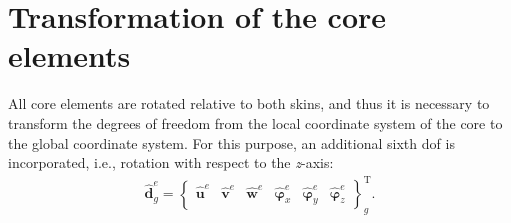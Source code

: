\section{Transformation of the core elements}
\label{sec:transformation}

All core elements are rotated relative to both skins, and thus it is necessary to transform the degrees of freedom from the local coordinate system of the core to the global coordinate system.
For this purpose, an additional sixth \ac{dof} is incorporated, i.e., rotation with respect to the \textit{z}-axis:
\begin{eqnarray}
	\widehat{\textbf{d}}^e_g = \left \{\begin{array}{cccccc}
		\widehat{\textbf{u}}^e & \widehat{\textbf{v}}^e &
		\widehat{\textbf{w}}^e & \widehat{\boldsymbol{\varphi}}_x^e &
		\widehat{\boldsymbol{\varphi}}_y^e & \widehat{\boldsymbol{\varphi}}_z^e
	\end{array}\right \}^{\mathrm{T}}_g.
	\label{eq:d6}
\end{eqnarray}

